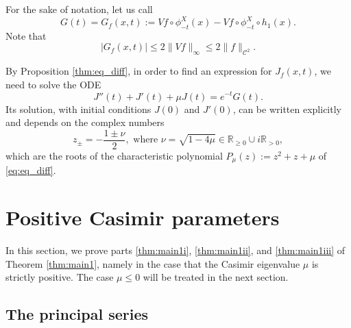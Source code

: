 \documentclass[11pt]{article}
\newcommand \R{\mathbb{R}}
\theoremstyle{definition}
\begin{document}
For the sake of notation, let us call
\begin{equation*}
G(t) = G_f(x,t) := Vf \circ \phi^X_{-t}(x) - Vf \circ \phi^X_{-t} \circ h_1(x).
\end{equation*}
Note that
\begin{equation}\label{eq:estimate_G}
|G_f(x,t)|\leq 2 \|Vf\|_\infty \leq 2 \|f\|_{\mathscr{C}^2}.
\end{equation}

By Proposition \ref{thm:eq_diff}, in order to find an expression for $J_f(x,t)$, we need to solve the ODE
\begin{equation}\label{eq:eq_diff}
J''(t)+J'(t)+ \mu J(t) = e^{-t}G(t).
\end{equation}
Its solution, with initial conditions $J(0)$ and $J'(0)$, can be written explicitly and depends on the complex numbers
\[
z_{\pm} = -\frac{1\pm \nu}{2}, \text{\ \ \ where\ \ \ } \nu = \sqrt{1-4\mu} \in \R_{\geq 0} \cup i\R_{>0},
\]
which are the roots of the characteristic polynomial $P_\mu(z):= z^2 + z +\mu$ of \eqref{eq:eq_diff}.

\section{Positive Casimir parameters}\label{section:positive_param}

In this section, we prove parts \eqref{thm:main1i}, \eqref{thm:main1ii}, and \eqref{thm:main1iii} of Theorem \ref{thm:main1}, namely in the case that the Casimir eigenvalue $\mu$ is strictly positive. The case $\mu \leq 0$ will be treated in the next section.

\subsection{The principal series}\label{sec:princ}
\end{document}
